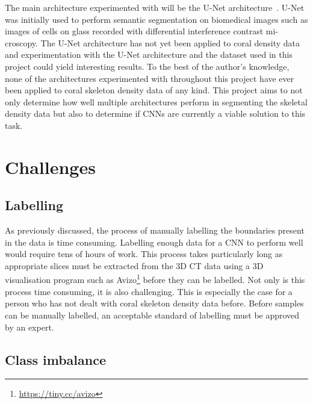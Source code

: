 The main architecture experimented with will be the U-Net architecture~\cite{ronneberger2015u}. U-Net was initially used to perform semantic segmentation on biomedical images such as images of cells on glass recorded with differential interference contrast mi-croscopy. The U-Net architecture has not yet been applied to coral density data and experimentation with the U-Net architecture and the dataset used in this project could yield interesting results. To the best of the author's knowledge, none of the architectures experimented with throughout this project have ever been applied to coral skeleton density data of any kind. This project aims to not only determine how well multiple architectures perform in segmenting the skeletal density data but also to determine if CNNs are currently a viable solution to this task.

\section{Challenges}
\label{sec:challenges}


\subsection{Labelling}

As previously discussed, the process of manually labelling the boundaries present in the data is time consuming. Labelling enough data for a CNN to perform well would require tens of hours of work. This process takes particularly long as appropriate slices must be extracted from the 3D CT data using a 3D visualisation program such as Avizo\footnote{\url{https://tiny.cc/avizo}} before they can be labelled. Not only is this process time consuming, it is also challenging. This is especially the case for a person who has not dealt with coral skeleton density data before. Before samples can be manually labelled, an acceptable standard of labelling must be approved by an expert.

\subsection{Class imbalance}

